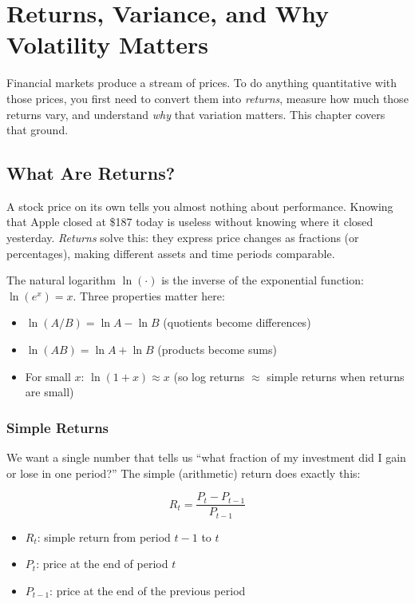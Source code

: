 \chapter{Returns, Variance, and Why Volatility Matters}
\label{ch:returns}

Financial markets produce a stream of prices.
To do anything quantitative with those prices, you first need to convert them into \emph{returns}, measure how much those returns vary, and understand \emph{why} that variation matters.
This chapter covers that ground.

\section{What Are Returns?}
\label{sec:returns-definition}

A stock price on its own tells you almost nothing about performance.
Knowing that Apple closed at \$187 today is useless without knowing where it closed yesterday.
\emph{Returns} solve this: they express price changes as fractions (or percentages), making different assets and time periods comparable.

\begin{prereq}
The natural logarithm $\ln(\cdot)$ is the inverse of the exponential function: $\ln(e^x) = x$.
Three properties matter here:
\begin{itemize}[nosep]
  \item $\ln(A/B) = \ln A - \ln B$ (quotients become differences)
  \item $\ln(AB) = \ln A + \ln B$ (products become sums)
  \item For small $x$: $\ln(1+x) \approx x$ (so log returns $\approx$ simple returns when returns are small)
\end{itemize}
\end{prereq}

\subsection{Simple Returns}
\label{sec:simple-returns}

We want a single number that tells us ``what fraction of my investment did I gain or lose in one period?''
The simple (arithmetic) return does exactly this:

\begin{equation}
  R_t = \frac{P_t - P_{t-1}}{P_{t-1}}
  \label{eq:simple-return}
\end{equation}
\begin{itemize}[nosep]
  \item $R_t$: simple return from period $t-1$ to $t$
  \item $P_t$: price at the end of period $t$
  \item $P_{t-1}$: price at the end of the previous period
\end{itemize}

